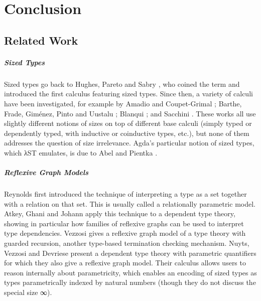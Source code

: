 \chapter{Conclusion}
\label{sec:conclusion}

\section{Related Work}
\label{sec:conclusion:related}

\paragraph{Sized Types} Sized types go back to Hughes, Pareto and Sabry
\cite{hughes1996}, who coined the term and introduced the first calculus
featuring sized types. Since then, a variety of calculi have been investigated,
for example by Amadio and Coupet-Grimal \cite{amadio1998}; Barthe, Frade,
Giménez, Pinto and Uustalu \cite{barthe2004}; Blanqui \cite{blanqui2004}; and
Sacchini \cite{sacchiniphd, sacchini2013}. These works all use slightly
different notions of sizes on top of different base calculi (simply typed or
dependently typed, with inductive or coinductive types, etc.), but none of them
addresses the question of size irrelevance. Agda's particular notion of sized
types, which λST emulates, is due to Abel and Pientka \cite{abel2016}.

\paragraph{Reflexive Graph Models} Reynolds \cite{reynolds1983} first
introduced the technique of interpreting a type as a set together with a
relation on that set. This is usually called a relationally parametric model.
Atkey, Ghani and Johann \cite{atkey2014} apply this technique to a dependent
type theory, showing in particular how families of reflexive graphs can be used
to interpret type dependencies. Vezzosi \cite{vezzosi2015} gives a reflexive
graph model of a type theory with guarded recursion, another type-based
termination checking mechanism. Nuyts, Vezzosi and Devriese \cite{nuyts2017}
present a dependent type theory with parametric quantifiers for which they also
give a reflexive graph model. Their calculus allows users to reason internally
about parametricity, which enables an encoding of sized types as types
parametrically indexed by natural numbers (though they do not discuss the
special size ∞).


